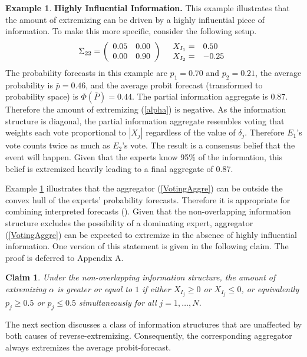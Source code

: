 \documentclass[11pt]{article}
\newtheorem{claim}[theorem]{Claim}
\theoremstyle{definition}
\newtheorem{example}[theorem]{Example}
\theoremstyle{definition}
\begin{document}
\begin{example}
\label{KeyInfo}
\textbf{Highly Influential Information.} This example illustrates that the amount of extremizing can be driven by a highly influential piece of information. To make this more specific, consider the following setup.
\begin{align*}
\Sigma_{22} =  \left(\begin{array}{c c}
0.05 & 0.00\\
0.00 & 0.90 \\
 \end{array}\right)
  && 
  \begin{array}{l l}
X_{I_1} =& 0.50\\
X_{I_2} =& -0.25
 \end{array}
\end{align*}
The probability forecasts in this example are $p_1 = 0.70$ and $p_2 = 0.21$, the average probability is $\bar{p} = 0.46$, and the average probit forecast (transformed to probability space) is $\Phi(\bar{P}) = 0.44$.  The partial information aggregate is $0.87$. Therefore the amount of extremizing (\ref{alpha}) is negative. As the information structure is diagonal, the partial information aggregate resembles voting that weights each vote proportional to $|X_j|$ regardless of the value of $\delta_j$. Therefore $E_1$'s vote counts twice as much as $E_2$'s vote. The result is a consensus belief that the event will happen. Given that the experts know 95\% of the information, this belief is extremized heavily leading to a final aggregate of $0.87$. 
\end{example}

Example \ref{KeyInfo} illustrates that the aggregator (\ref{VotingAggre}) can be outside the convex hull of the experts' probability forecasts. Therefore it is appropriate for combining interpreted forecasts (\cite{parunak2013characterizing}). Given that the non-overlapping information structure excludes the possibility of a dominating expert, aggregator (\ref{VotingAggre}) can be expected to extremize in the absence of highly influential information. 
% 
One version of this statement is given in the following claim. The proof is deferred to Appendix A.
 \begin{claim}
\label{positiveThmVote}
Under the non-overlapping information structure, the amount of extremizing $\alpha$ is greater or equal to $1$ if either $X_{I_j} \geq 0$ or  $X_{I_j} \leq 0$, or equivalently $p_j \geq 0.5$ or $p_j \leq 0.5$ simultaneously for all $j = 1, \dots, N$. 
\end{claim}
The next section discusses a class of information structures that are unaffected by both causes of reverse-extremizing. Consequently, the corresponding aggregator always extremizes the average probit-forecast. 
\end{document}
